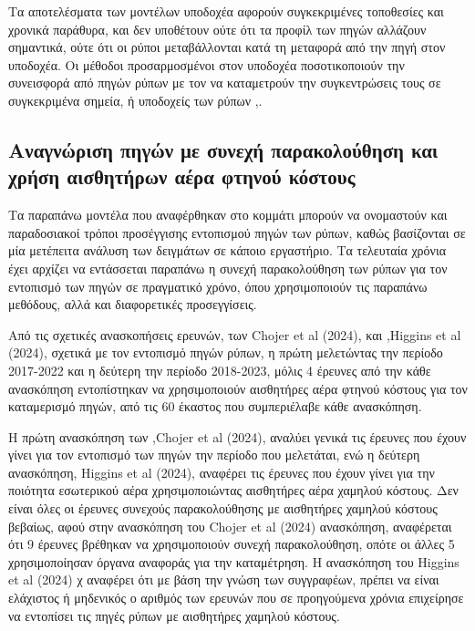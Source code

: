 Τα αποτελέσματα των μοντέλων υποδοχέα αφορούν συγκεκριμένες τοποθεσίες και χρονικά παράθυρα, και δεν υποθέτουν ούτε ότι τα προφίλ των πηγών αλλάζουν σημαντικά, ούτε ότι οι ρύποι μεταβάλλονται κατά τη μεταφορά από την πηγή στον υποδοχέα.
Οι μέθοδοι προσαρμοσμένοι στον υποδοχέα ποσοτικοποιούν την συνεισφορά από πηγών ρύπων με τον να καταμετρούν την συγκεντρώσεις τους σε συγκεκριμένα σημεία, ή υποδοχείς των ρύπων \cite{Higgins2024},\cite{Mircea2020}.



\subsection {Αναγνώριση πηγών με συνεχή παρακολούθηση και χρήση αισθητήρων αέρα φτηνού κόστους}

Τα παραπάνω μοντέλα που αναφέρθηκαν στο κομμάτι \label {sub:{Επιμερισμός ρύπων (Source Apportionment)}} μπορούν να ονομαστούν και παραδοσιακοί τρόποι προσέγγισης εντοπισμού πηγών των ρύπων, καθώς βασίζονται σε μία μετέπειτα ανάλυση των δειγμάτων σε κάποιο εργαστήριο.
 Τα τελευταία χρόνια έχει αρχίζει να εντάσσεται παραπάνω η συνεχή παρακολούθηση των ρύπων για τον εντοπισμό των πηγών σε πραγματικό χρόνο, όπου χρησιμοποιούν τις παραπάνω μεθόδους, αλλά και διαφορετικές προσεγγίσεις. 

Από τις σχετικές ανασκοπήσεις ερευνών, των Chojer et al (2024), \cite{CHOJER2024103534} και ,Higgins et al (2024),\cite{Higgins2024} σχετικά με τον εντοπισμό πηγών ρύπων, η πρώτη μελετώντας την περίοδο 2017-2022 και η δεύτερη την περίοδο 2018-2023,
μόλις 4 έρευνες από την κάθε ανασκόπηση εντοπίστηκαν να χρησιμοποιούν αισθητήρες αέρα φτηνού κόστους για τον καταμερισμό πηγών, από τις 60 έκαστος που συμπεριέλαβε κάθε ανασκόπηση.

Η πρώτη ανασκόπηση των ,Chojer et al (2024),\cite{CHOJER2024103534} αναλύει γενικά τις έρευνες που έχουν γίνει για τον εντοπισμό των πηγών την περίοδο που μελετάται, ενώ η δεύτερη ανασκόπηση, Higgins et al (2024),
\cite{Higgins2024} αναφέρει τις έρευνες που έχουν γίνει για την ποιότητα εσωτερικού αέρα χρησιμοποιώντας αισθητήρες αέρα χαμηλού κόστους. Δεν είναι όλες οι έρευνες συνεχούς παρακολούθησης με αισθητήρες χαμηλού κόστους βεβαίως, 
αφού στην ανασκόπηση του Chojer et al (2024) \cite{CHOJER2024103534} ανασκόπηση, αναφέρεται ότι 9 έρευνες βρέθηκαν να χρησιμοποιούν συνεχή παρακολούθηση, οπότε οι άλλες 5 χρησιμοποίησαν όργανα αναφοράς για την καταμέτρηση.
Η ανασκόπηση του Higgins et al (2024) \cite{Higgins2024} χ αναφέρει ότι με βάση την γνώση των συγγραφέων, πρέπει να είναι ελάχιστος ή μηδενικός ο αριθμός των ερευνών που σε προηγούμενα χρόνια επιχείρησε να εντοπίσει τις πηγές ρύπων με αισθητήρες χαμηλού κόστους.

